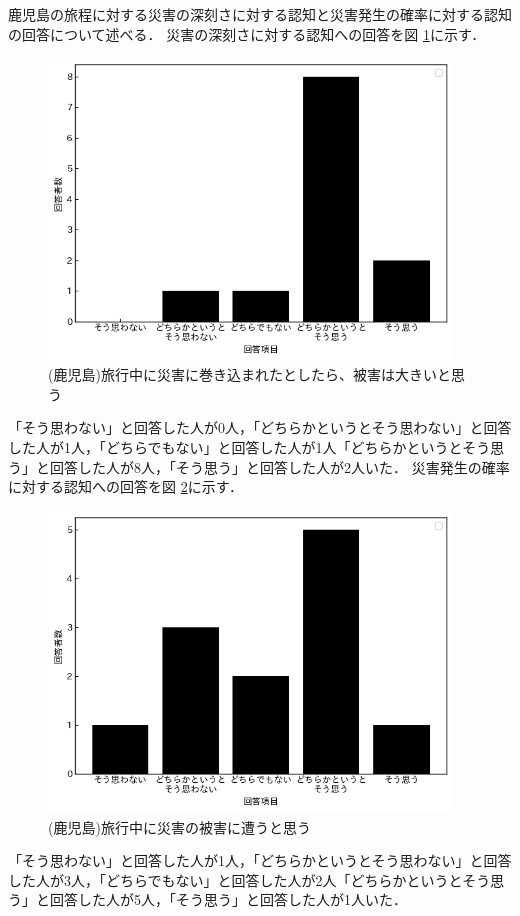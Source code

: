 鹿児島の旅程に対する災害の深刻さに対する認知と災害発生の確率に対する認知の回答について述べる．
災害の深刻さに対する認知への回答を図 \ref{fig:forecast_kagoshima_1}に示す．
\begin{figure}[H]
  \centering
  \includegraphics[height=8cm]{./fig/forecast_kagoshima_1.png}
  \caption{(鹿児島)旅行中に災害に巻き込まれたとしたら、被害は大きいと思う}
  \label{fig:forecast_kagoshima_1}
\end{figure}
「そう思わない」と回答した人が0人，「どちらかというとそう思わない」と回答した人が1人，「どちらでもない」と回答した人が1人「どちらかというとそう思う」と回答した人が8人，「そう思う」と回答した人が2人いた．
災害発生の確率に対する認知への回答を図 \ref{fig:forecast_kagoshima_2}に示す．
\begin{figure}[H]
  \centering
  \includegraphics[height=8cm]{./fig/forecast_kagoshima_2.png}
  \caption{(鹿児島)旅行中に災害の被害に遭うと思う}
  \label{fig:forecast_kagoshima_2}
\end{figure}
「そう思わない」と回答した人が1人，「どちらかというとそう思わない」と回答した人が3人，「どちらでもない」と回答した人が2人「どちらかというとそう思う」と回答した人が5人，「そう思う」と回答した人が1人いた．

